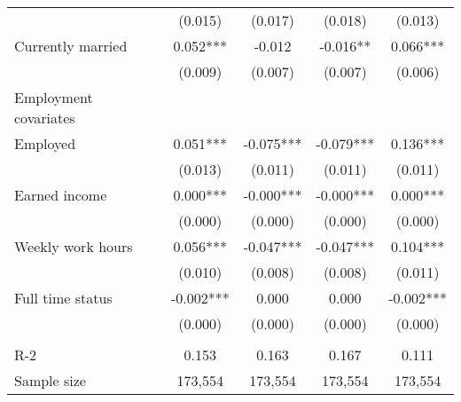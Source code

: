 \begin{tabular}{lcccc}
 & (0.015)   & (0.017)   & (0.018)   & (0.013)  \\
 Currently married   & 0.052***   & -0.012   & -0.016**   & 0.066***  \\
 & (0.009)   & (0.007)   & (0.007)   & (0.006)  \\
 Employment covariates  \\
 Employed   & 0.051***   & -0.075***   & -0.079***   & 0.136***  \\
 & (0.013)   & (0.011)   & (0.011)   & (0.011)  \\
 Earned income   & 0.000***   & -0.000***   & -0.000***   & 0.000***  \\
 & (0.000)   & (0.000)   & (0.000)   & (0.000)  \\
 Weekly work hours   & 0.056***   & -0.047***   & -0.047***   & 0.104***  \\
 & (0.010)   & (0.008)   & (0.008)   & (0.011)  \\
 Full time status   & -0.002***   & 0.000   & 0.000   & -0.002***  \\
 & (0.000)   & (0.000)   & (0.000)   & (0.000)  \\
\\
R-2 & 0.153 & 0.163 & 0.167 & 0.111 \\
Sample size & 173,554 & 173,554 & 173,554 & 173,554 \\
\bottomrule
\bottomrule
\end{tabular}